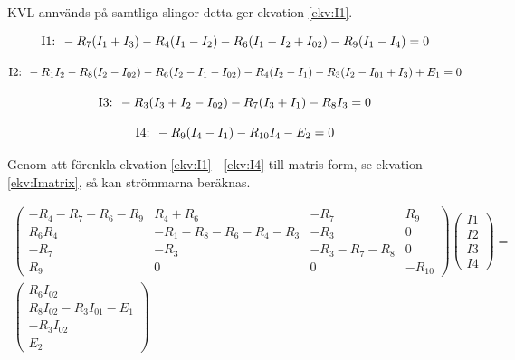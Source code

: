 \documentclass[a4paper,12pt]{article}
\begin{document}
KVL annvänds på samtliga slingor detta ger ekvation \ref{ekv:I1}.

\begin{equation}
\text{I1: }-R_7(I_1+I_3)-R_4(I_1-I_2)-R_6(I_1-I_2+I_{02})-R_9(I_1-I_4)=0 \\
\label{ekv:I1}
\end{equation}

\begin{equation}
\text{I2: }-R_1I_2-R_8(I_2-I_{02})-R_6(I_2-I_1-I_{02})-R_4(I_2-I_1)-R_3(I_2-I_{01}+I_3)+E_1=0 \\
\label{ekv:I2}
\end{equation}

\begin{equation}
\text{I3: }-R_3(I_3+I_2-I_{02})-R_7(I_3+I_1)-R_8I_3=0 \\
\label{ekv:I3}
\end{equation}

\begin{equation}
\text{I4: }-R_9(I_4-I_1)-R_{10}I_4-E_2=0 \\
\label{ekv:I4}
\end{equation}

Genom att förenkla ekvation \ref{ekv:I1} - \ref{ekv:I4} till matris form, se ekvation \ref{ekv:Imatrix}, så kan strömmarna beräknas.

\begin{equation}
\begin{split}
\begin{pmatrix}
  -R_4-R_7-R_6-R_9 & R_4+R_6 & -R_7 & R_9\\
   R_6 R_4 & -R_1-R_8-R_6-R_4-R_3 & -R_3 & 0 \\
  -R_7 & -R_3 & -R_3-R_7-R_8 & 0 \\
   R_9 & 0 & 0 & -R_{10}
 \end{pmatrix}
 \begin{pmatrix}
    I1 \\
    I2 \\
    I3 \\
    I4
  \end{pmatrix}
 =\\
 \begin{pmatrix}
    R_6I_{02} \\
    R_8I_{02}-R_3I_{01}-E_1 \\
    -R_3I_{02} \\
    E_2
  \end{pmatrix}
  \end{split}
\label{ekv:Imatrix}
\end{equation}
\end{document}
